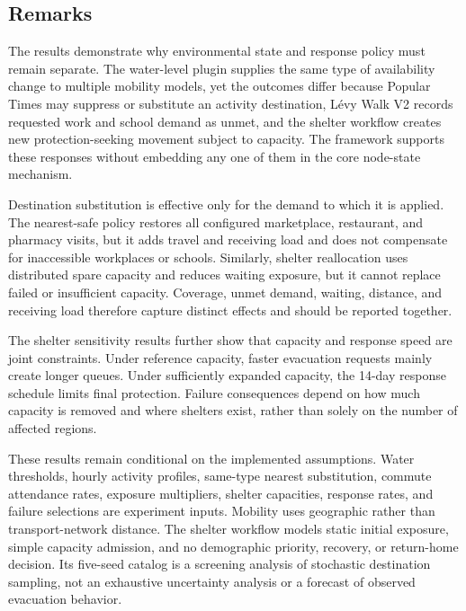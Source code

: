 \subsection{Remarks}

The results demonstrate why environmental state and response policy must remain separate. The water-level plugin supplies the same type of availability change to multiple mobility models, yet the outcomes differ because Popular Times may suppress or substitute an activity destination, L\'evy Walk V2 records requested work and school demand as unmet, and the shelter workflow creates new protection-seeking movement subject to capacity. The framework supports these responses without embedding any one of them in the core node-state mechanism.

Destination substitution is effective only for the demand to which it is applied. The nearest-safe policy restores all configured marketplace, restaurant, and pharmacy visits, but it adds travel and receiving load and does not compensate for inaccessible workplaces or schools. Similarly, shelter reallocation uses distributed spare capacity and reduces waiting exposure, but it cannot replace failed or insufficient capacity. Coverage, unmet demand, waiting, distance, and receiving load therefore capture distinct effects and should be reported together.

The shelter sensitivity results further show that capacity and response speed are joint constraints. Under reference capacity, faster evacuation requests mainly create longer queues. Under sufficiently expanded capacity, the 14-day response schedule limits final protection. Failure consequences depend on how much capacity is removed and where shelters exist, rather than solely on the number of affected regions.

These results remain conditional on the implemented assumptions. Water thresholds, hourly activity profiles, same-type nearest substitution, commute attendance rates, exposure multipliers, shelter capacities, response rates, and failure selections are experiment inputs. Mobility uses geographic rather than transport-network distance. The shelter workflow models static initial exposure, simple capacity admission, and no demographic priority, recovery, or return-home decision. Its five-seed catalog is a screening analysis of stochastic destination sampling, not an exhaustive uncertainty analysis or a forecast of observed evacuation behavior.
